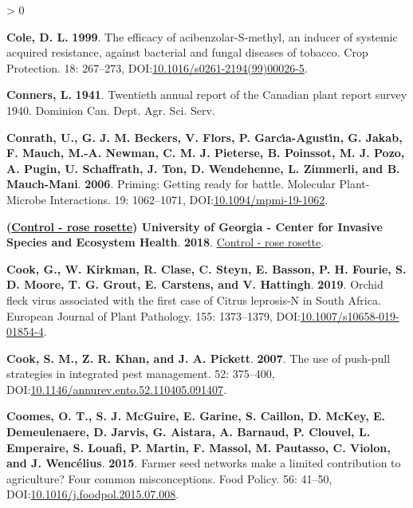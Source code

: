 \documentclass{ufdissertation}[overrideChapters] %
\newlength{\cslhangindent}
\newenvironment{CSLReferences}[2] %
 {%
  \setlength{\parindent}{0pt}
  \ifodd #1 \everypar{\setlength{\hangindent}{\cslhangindent}}\ignorespaces\fi
  \ifnum #2 > 0
  \setlength{\parskip}{#2\baselineskip}
  \fi
 }%
 {}
\begin{document}
{\begin{CSLReferences}{1}{1}
\leavevmode{}%
\textbf{Cole, D. L.} \textbf{1999}. The efficacy of acibenzolar-{S}-methyl, an inducer of systemic acquired resistance, against bacterial and fungal diseases of tobacco. Crop Protection. 18: 267--273, DOI:\href{https://doi.org/10.1016/s0261-2194(99)00026-5}{10.1016/s0261-2194(99)00026-5}.

\leavevmode{}%
\textbf{Conners, L.} \textbf{1941}. Twentieth annual report of the {Canadian} plant report survey 1940. Dominion Can. Dept. Agr. Sci. Serv.

\leavevmode{}%
\textbf{Conrath, U., G. J. M. Beckers, V. Flors, P. Garcı́a-Agustı́n, G. Jakab, F. Mauch, M.-A. Newman, C. M. J. Pieterse, B. Poinssot, M. J. Pozo, A. Pugin, U. Schaffrath, J. Ton, D. Wendehenne, L. Zimmerli, and B. Mauch-Mani}. \textbf{2006}. Priming: Getting ready for battle. Molecular Plant-Microbe Interactions{\textregistered}. 19: 1062--1071, DOI:\href{https://doi.org/10.1094/mpmi-19-1062}{10.1094/mpmi-19-1062}.

\leavevmode{}%
\textbf{(\href{https://roserosette.org/control/}{Control - rose rosette}) University of Georgia - Center for Invasive Species and Ecosystem Health}. \textbf{2018}. \href{https://roserosette.org/control/}{Control - rose rosette}.

\leavevmode{}%
\textbf{Cook, G., W. Kirkman, R. Clase, C. Steyn, E. Basson, P. H. Fourie, S. D. Moore, T. G. Grout, E. Carstens, and V. Hattingh}. \textbf{2019}. {Orchid fleck virus} associated with the first case of {Citrus leprosis}-{N} in {South Africa}. European Journal of Plant Pathology. 155: 1373--1379, DOI:\href{https://doi.org/10.1007/s10658-019-01854-4}{10.1007/s10658-019-01854-4}.

\leavevmode{}%
\textbf{Cook, S. M., Z. R. Khan, and J. A. Pickett}. \textbf{2007}. The use of push-pull strategies in integrated pest management. 52: 375--400, DOI:\href{https://doi.org/10.1146/annurev.ento.52.110405.091407}{10.1146/annurev.ento.52.110405.091407}.

\leavevmode{}%
\textbf{Coomes, O. T., S. J. McGuire, E. Garine, S. Caillon, D. McKey, E. Demeulenaere, D. Jarvis, G. Aistara, A. Barnaud, P. Clouvel, L. Emperaire, S. Louafi, P. Martin, F. Massol, M. Pautasso, C. Violon, and J. Wencélius}. \textbf{2015}. Farmer seed networks make a limited contribution to agriculture? Four common misconceptions. Food Policy. 56: 41--50, DOI:\href{https://doi.org/10.1016/j.foodpol.2015.07.008}{10.1016/j.foodpol.2015.07.008}.


\end{CSLReferences}}
\end{document}
